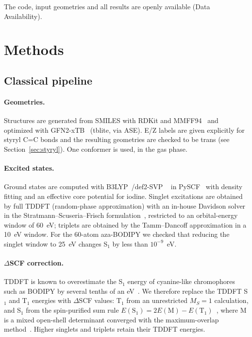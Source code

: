 \documentclass[journal=jpcafh,manuscript=article]{achemso}
\begin{document}
The code, input geometries and all results are openly available (Data Availability).

\section{Methods}

\subsection{Classical pipeline}

\paragraph{Geometries.} Structures are generated from SMILES with RDKit and MMFF94~\cite{Halgren1996}
and optimized with GFN2-xTB~\cite{Bannwarth2019} (tblite, via ASE). E/Z labels are given explicitly
for styryl C=C bonds and the resulting geometries are checked to be trans (see
Section~\ref{sec:styryl}). One conformer is used, in the gas phase.

\paragraph{Excited states.} Ground states are computed with B3LYP~\cite{Becke1993,Stephens1994}/def2-SVP%
~\cite{Weigend2005} in PySCF~\cite{Sun2020} with density fitting and an effective core potential for
iodine. Singlet excitations are obtained by full TDDFT (random-phase approximation) with an
in-house Davidson solver in the Stratmann--Scuseria--Frisch formulation~\cite{Stratmann1998},
restricted to an orbital-energy window of 60~eV; triplets are obtained by the Tamm--Dancoff
approximation in a 10~eV window. For the 60-atom aza-BODIPY we checked that reducing the singlet
window to 25~eV changes S$_1$ by less than $10^{-9}$~eV.

\paragraph{$\Delta$SCF correction.} TDDFT is known to overestimate the S$_1$ energy of
cyanine-like chromophores such as BODIPY by several tenths of an eV~\cite{Momeni2015,LeGuennic2015}.
We therefore replace the TDDFT S$_1$ and T$_1$ energies with $\Delta$SCF values: T$_1$ from an
unrestricted $M_S=1$ calculation, and S$_1$ from the spin-purified sum rule
$E(\mathrm{S}_1)=2E(\mathrm{M})-E(\mathrm{T}_1)$~\cite{Ziegler1977}, where M is a mixed
open-shell determinant converged with the maximum-overlap method~\cite{Gilbert2008}. Higher
singlets and triplets retain their TDDFT energies.
\end{document}
